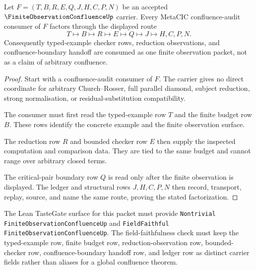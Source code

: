 \begin{theorem}
\label{thm:finite-observation-confluence-metacic-handoff}
Let $F=(T,B,R,E,Q,J,H,C,P,N)$ be an accepted $\FiniteObservationConfluenceUp$ carrier. Every MetaCIC confluence-audit consumer of $F$ factors through the displayed route
$$
T \longmapsto B \longmapsto R \longmapsto E \longmapsto Q \longmapsto J \longmapsto H,C,P,N .
$$
Consequently typed-example checker rows, reduction observations, and confluence-boundary handoff are consumed as one finite observation packet, not as a claim of arbitrary confluence.
\end{theorem}
\begin{proof}
Start with a confluence-audit consumer of $F$. The carrier gives no direct coordinate for arbitrary Church--Rosser, full parallel diamond, subject reduction, strong normalisation, or residual-substitution compatibility.

The consumer must first read the typed-example row $T$ and the finite budget row $B$. These rows identify the concrete example and the finite observation surface.

The reduction row $R$ and bounded checker row $E$ then supply the inspected computation and comparison data. They are tied to the same budget and cannot range over arbitrary closed terms.

The critical-pair boundary row $Q$ is read only after the finite observation is displayed. The ledger and structural rows $J,H,C,P,N$ then record, transport, replay, source, and name the same route, proving the stated factorization.
\end{proof}

The Lean TasteGate surface for this packet must provide \texttt{Nontrivial FiniteObservationConfluenceUp} and \texttt{FieldFaithful FiniteObservationConfluenceUp}. The field-faithfulness check must keep the typed-example row, finite budget row, reduction-observation row, bounded-checker row, confluence-boundary handoff row, and ledger row as distinct carrier fields rather than aliases for a global confluence theorem.


